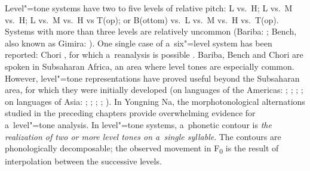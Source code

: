Level"=tone systems have two to five levels
of relative pitch: L vs.\ H; L vs.\ M vs.\ H; L vs.\ M vs.\ H vs T(op); or B(ottom) vs.\ L vs.\ M vs.\ H
vs.\ T(op). Systems with more than three levels are relatively uncommon (Bariba:
\citealt{welmers1952}; Bench, also known as Gimira: \citealt{wedekind1983,wedekind1985}). One single case
of a~six"=level system has been reported: Chori \citep{dihoff1977}, for which a~reanalysis is possible
\citep{odden1995}. Bariba, Bench and Chori are spoken in Subsaharan Africa, an area where level tones
are especially common. However, level"=tone representations have proved useful beyond the Subsaharan
area, for which they were initially developed (on languages of the Americas:
\citealt{gomezimbert2001}; \citealt{hargusetal2005}; \citealt{gironhiguitaetal2007};
\citealt{michael2010}; on languages of Asia: \citealt{ding2001};
\citealt{hymanetal2002a,hymanetal2004}; \citealt{donohue2003,donohue2005}; \citealt{evans2008a};
\citealt{jacques2011a}). In Yongning Na, the morphotonological alternations studied in
the preceding chapters provide overwhelming evidence for a~level"=tone analysis. In level"=tone
systems, a~phonetic {contour} is \textit{the realization of two or more level tones on a~single
  syllable}. The contours are phonologically decomposable; the observed movement in F\textsubscript{0} is the result
of interpolation between the successive levels.

